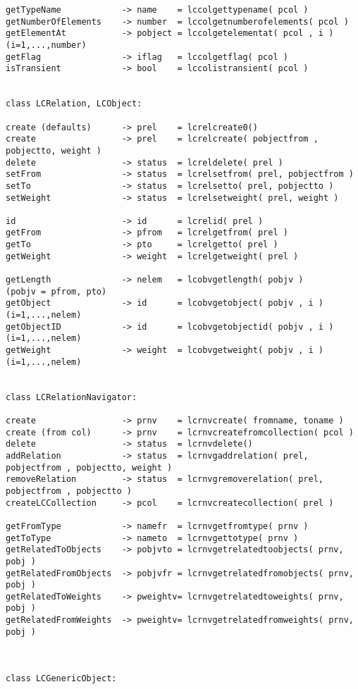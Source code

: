 \begin{scriptsize}
\begin{verbatim}
getTypeName            -> name    = lccolgettypename( pcol )
getNumberOfElements    -> number  = lccolgetnumberofelements( pcol )
getElementAt           -> pobject = lccolgetelementat( pcol , i )  (i=1,...,number)
getFlag                -> iflag   = lccolgetflag( pcol )
isTransient            -> bool    = lccolistransient( pcol )


class LCRelation, LCObject:

create (defaults)      -> prel    = lcrelcreate0()
create                 -> prel    = lcrelcreate( pobjectfrom , pobjectto, weight )
delete                 -> status  = lcreldelete( prel )
setFrom                -> status  = lcrelsetfrom( prel, pobjectfrom )
setTo                  -> status  = lcrelsetto( prel, pobjectto )
setWeight              -> status  = lcrelsetweight( prel, weight )

id                     -> id      = lcrelid( prel )
getFrom                -> pfrom   = lcrelgetfrom( prel )
getTo                  -> pto     = lcrelgetto( prel )
getWeight              -> weight  = lcrelgetweight( prel )

getLength              -> nelem   = lcobvgetlength( pobjv )        (pobjv = pfrom, pto)
getObject              -> id      = lcobvgetobject( pobjv , i )    (i=1,...,nelem)
getObjectID            -> id      = lcobvgetobjectid( pobjv , i )  (i=1,...,nelem)
getWeight              -> weight  = lcobvgetweight( pobjv , i )    (i=1,...,nelem)


class LCRelationNavigator:

create                 -> prnv    = lcrnvcreate( fromname, toname )
create (from col)      -> prnv    = lcrnvcreatefromcollection( pcol )
delete                 -> status  = lcrnvdelete()
addRelation            -> status  = lcrnvgaddrelation( prel, pobjectfrom , pobjectto, weight )
removeRelation         -> status  = lcrnvgremoverelation( prel, pobjectfrom , pobjectto )
createLCCollection     -> pcol    = lcrnvcreatecollection( prel )

getFromType            -> namefr  = lcrnvgetfromtype( prnv )
getToType              -> nameto  = lcrnvgettotype( prnv )
getRelatedToObjects    -> pobjvto = lcrnvgetrelatedtoobjects( prnv, pobj )
getRelatedFromObjects  -> pobjvfr = lcrnvgetrelatedfromobjects( prnv, pobj )
getRelatedToWeights    -> pweightv= lcrnvgetrelatedtoweights( prnv, pobj )
getRelatedFromWeights  -> pweightv= lcrnvgetrelatedfromweights( prnv, pobj )



class LCGenericObject:


\end{verbatim}
\end{scriptsize}
